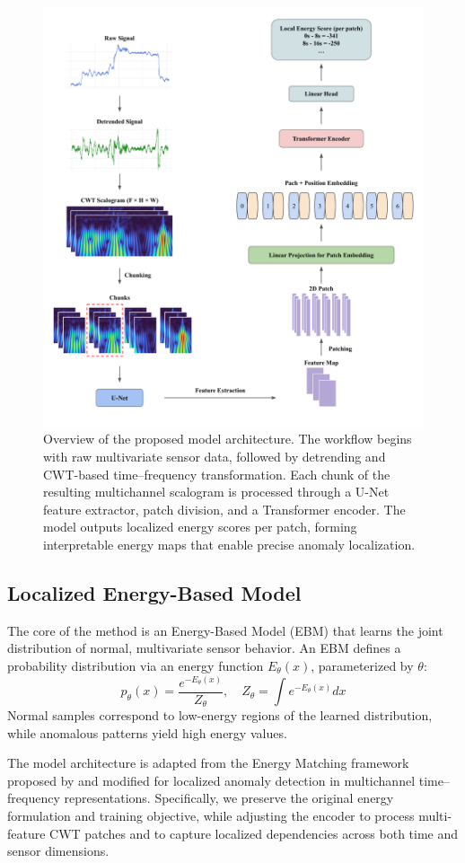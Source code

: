 \documentclass{article}
\begin{document}
\begin{figure}[t]
    \centering
    \includegraphics[width=0.8\linewidth]{figures/model_architecture.pdf}
    \caption{
    Overview of the proposed model architecture. 
    The workflow begins with raw multivariate sensor data, followed by detrending and CWT-based time–frequency transformation.
    Each chunk of the resulting multichannel scalogram is processed through a U-Net feature extractor, patch division, and a Transformer encoder.
    The model outputs localized energy scores per patch, forming interpretable energy maps that enable precise anomaly localization.}\label{fig:model_architecture}
\end{figure}

\subsection{Localized Energy-Based Model}

The core of the method is an Energy-Based Model (EBM) that learns the joint distribution of normal, multivariate sensor behavior.
An EBM defines a probability distribution via an energy function $E_\theta(x)$, parameterized by $\theta$:
\[
 p_\theta(x) = \frac{e^{-E_\theta(x)}}{Z_\theta}, \quad Z_\theta = \int e^{-E_\theta(x)} dx \]
Normal samples correspond to low-energy regions of the learned distribution, while anomalous patterns yield high energy values.

The model architecture is adapted from the Energy Matching framework proposed by \citet{balcerak2025energymatchingunifyingflow} and modified for localized anomaly detection in multichannel time–frequency representations. 
Specifically, we preserve the original energy formulation and training objective, while adjusting the encoder to process multi-feature CWT patches and to capture localized dependencies across both time and sensor dimensions.
\end{document}
